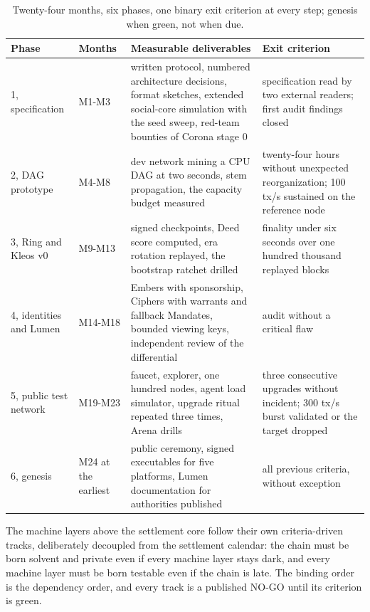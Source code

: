 \begin{table}[htbp]
\centering
\small
\caption{Twenty-four months, six phases, one binary exit criterion at
every step; genesis when green, not when due.}
\label{tab:roadmap}
\begin{tabularx}{\textwidth}{@{}L{2.9cm}L{1.4cm}YY@{}}
\toprule
Phase & Months & Measurable deliverables & Exit criterion \\
, specification & M1-M3 & written protocol, numbered architecture decisions, format sketches, extended social-core simulation with the seed sweep, red-team bounties of Corona stage 0 & specification read by two external readers; first audit findings closed \\
2, DAG prototype & M4-M8 & dev network mining a CPU DAG at two seconds, stem propagation, the capacity budget measured & twenty-four hours without unexpected reorganization; 100 tx/s sustained on the reference node \\
3, Ring and Kleos v0 & M9-M13 & signed checkpoints, Deed score computed, era rotation replayed, the bootstrap ratchet drilled & finality under six seconds over one hundred thousand replayed blocks \\
4, identities and Lumen & M14-M18 & Embers with sponsorship, Ciphers with warrants and fallback Mandates, bounded viewing keys, independent review of the differential & audit without a critical flaw \\
5, public test network & M19-M23 & faucet, explorer, one hundred nodes, agent load simulator, upgrade ritual repeated three times, Arena drills & three consecutive upgrades without incident; 300 tx/s burst validated or the target dropped \\
6, genesis & M24 at the earliest & public ceremony, signed executables for five platforms, Lumen documentation for authorities published & all previous criteria, without exception \\
\bottomrule
\end{tabularx}
\end{table}

The machine layers above the settlement core follow their own
criteria-driven tracks, deliberately decoupled from the settlement
calendar: the chain must be born solvent and private even if every
machine layer stays dark, and every machine layer must be born testable
even if the chain is late. The binding order is the dependency order,
and every track is a published NO-GO until its criterion is green.

